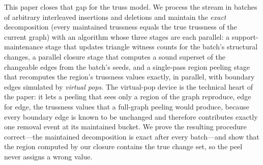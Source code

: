This paper closes that gap for the truss model.
We process the stream in batches of arbitrary interleaved insertions and deletions and maintain the \emph{exact} decomposition (every maintained trussness equals the true trussness of the current graph) with an algorithm whose three stages are each parallel: a support-maintenance stage that updates triangle witness counts for the batch's structural changes, a parallel closure stage that computes a sound superset of the changeable edges from the batch's seeds, and a single-pass region peeling stage that recomputes the region's trussness values exactly, in parallel, with boundary edges simulated by \emph{virtual pops}.
The virtual-pop device is the technical heart of the paper: it lets a peeling that sees only a region of the graph reproduce, edge for edge, the trussness values that a full-graph peeling would produce, because every boundary edge is known to be unchanged and therefore contributes exactly one removal event at its maintained bucket.
We prove the resulting procedure correct---the maintained decomposition is exact after every batch---and show that the region computed by our closure contains the true change set, so the peel never assigns a wrong value.

